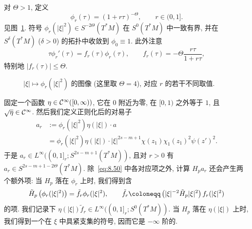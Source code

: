 对 $\Theta > 1$, 定义
\begin{equation}\label{eq:8.60}
    \phi_r(\tau) = (1 + r\tau)^{-\Theta}, \qquad r \in (0, 1].
\end{equation}
见图~\ref{fig:8.4}. 符号 $\phi_r(| \xi |^2) \in S^{-2\Theta}(T^*M)$ 在 $S^0(T^*M)$ 中一致有界, 并在 $S^\delta(T^*M)$ ($\delta > 0$) 的拓扑中收敛到 $\phi_0 \equiv 1$. 此外注意
\begin{equation}\label{eq:8.61}
    \tau\phi_r'(\tau) = f_r(\tau)\phi_r(\tau), \qquad f_r(\tau) = -\Theta\frac{r\tau}{1 + r\tau},
\end{equation}
特别地 $| f_r(\tau) | \le \Theta$.

\begin{figure}[htbp]
\centering
\drawFigEightFour
\caption{$| \xi | \mapsto \phi_r(| \xi |^2)$ 的图像 (这里取 $\Theta = 4$), 对应 $r$ 的若干不同取值.}
\label{fig:8.4}
\end{figure}

固定一个函数 $\eta \in \mathcal{C}^\infty([0, \infty))$, 它在 $0$ 附近为零, 在 $[0, 1)$ 之外等于 $1$, 且 $\sqrt{\eta} \in \mathcal{C}^\infty$. 然后我们定义正则化后的对易子
\begin{equation}\label{eq:8.62}
    \begin{aligned}
        a_r &:= \phi_r(| \xi |^2)\eta(| \xi |) \cdot a \\
        &= \phi_r(| \xi |^2)\eta(| \xi |) \cdot | \xi |^{2s-m+1}\chi(z_1)\chi_1(z_1)^2\psi(z')^2.
    \end{aligned}
\end{equation}
于是 $a_r \in L^\infty((0, 1]_r; S^{2s-m+1}(T^*M))$, 且对 $r > 0$ 有 $a_r \in S^{2s-m+1-2\Theta}(T^*M)$. 除~\eqref{eq:8.50} 中各对应项之外, 计算 $H_p a_r$ 还会产生两个额外项: 当 $H_p$ 落在 $\phi_r$ 上时, 我们得到含
\begin{equation}\label{eq:8.63}
    \tilde{H}_p\left( \phi_r(| \xi |^2) \right) = \tilde{f}_r\phi_r(| \xi |^2), \qquad \tilde{f}_r \defeq \left( | \xi |^{-2}\tilde{H}_p| \xi |^2 \right)f_r(| \xi |^2)
\end{equation}
的项. 我们记录下 $\eta(| \xi |)\tilde{f}_r \in L^\infty((0, 1]_r; S^0(T^*M))$. 当 $H_p$ 落在 $\eta(| \xi |)$ 上时, 我们得到一个在 $\xi$ 中具紧支集的符号, 因而它是 $-\infty$ 阶的.

